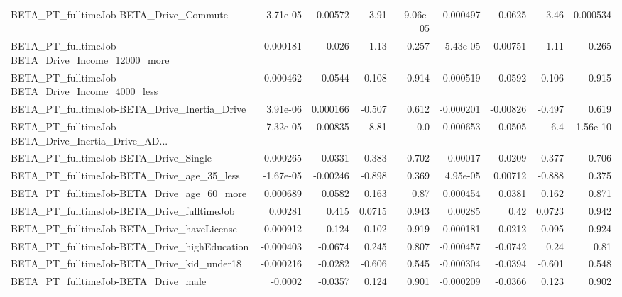 \begin{tabular}{lrrrrrrrr}
BETA\_PT\_fulltimeJob-BETA\_Drive\_Commute             &    3.71e-05 &      0.00572 &    -3.91 & 9.06e-05 &   0.000497 &      0.0625 &        -3.46 &      0.000534 \\
BETA\_PT\_fulltimeJob-BETA\_Drive\_Income\_12000\_more   &   -0.000181 &       -0.026 &    -1.13 &    0.257 &  -5.43e-05 &    -0.00751 &        -1.11 &         0.265 \\
BETA\_PT\_fulltimeJob-BETA\_Drive\_Income\_4000\_less    &    0.000462 &       0.0544 &    0.108 &    0.914 &   0.000519 &      0.0592 &        0.106 &         0.915 \\
BETA\_PT\_fulltimeJob-BETA\_Drive\_Inertia\_Drive       &    3.91e-06 &     0.000166 &   -0.507 &    0.612 &  -0.000201 &    -0.00826 &       -0.497 &         0.619 \\
BETA\_PT\_fulltimeJob-BETA\_Drive\_Inertia\_Drive\_AD... &    7.32e-05 &      0.00835 &    -8.81 &      0.0 &   0.000653 &      0.0505 &         -6.4 &      1.56e-10 \\
BETA\_PT\_fulltimeJob-BETA\_Drive\_Single              &    0.000265 &       0.0331 &   -0.383 &    0.702 &    0.00017 &      0.0209 &       -0.377 &         0.706 \\
BETA\_PT\_fulltimeJob-BETA\_Drive\_age\_35\_less         &   -1.67e-05 &     -0.00246 &   -0.898 &    0.369 &   4.95e-05 &     0.00712 &       -0.888 &         0.375 \\
BETA\_PT\_fulltimeJob-BETA\_Drive\_age\_60\_more         &    0.000689 &       0.0582 &    0.163 &     0.87 &   0.000454 &      0.0381 &        0.162 &         0.871 \\
BETA\_PT\_fulltimeJob-BETA\_Drive\_fulltimeJob         &     0.00281 &        0.415 &   0.0715 &    0.943 &    0.00285 &        0.42 &       0.0723 &         0.942 \\
BETA\_PT\_fulltimeJob-BETA\_Drive\_haveLicense         &   -0.000912 &       -0.124 &   -0.102 &    0.919 &  -0.000181 &     -0.0212 &       -0.095 &         0.924 \\
BETA\_PT\_fulltimeJob-BETA\_Drive\_highEducation       &   -0.000403 &      -0.0674 &    0.245 &    0.807 &  -0.000457 &     -0.0742 &         0.24 &          0.81 \\
BETA\_PT\_fulltimeJob-BETA\_Drive\_kid\_under18         &   -0.000216 &      -0.0282 &   -0.606 &    0.545 &  -0.000304 &     -0.0394 &       -0.601 &         0.548 \\
BETA\_PT\_fulltimeJob-BETA\_Drive\_male                &     -0.0002 &      -0.0357 &    0.124 &    0.901 &  -0.000209 &     -0.0366 &        0.123 &         0.902 \\

\end{tabular}
